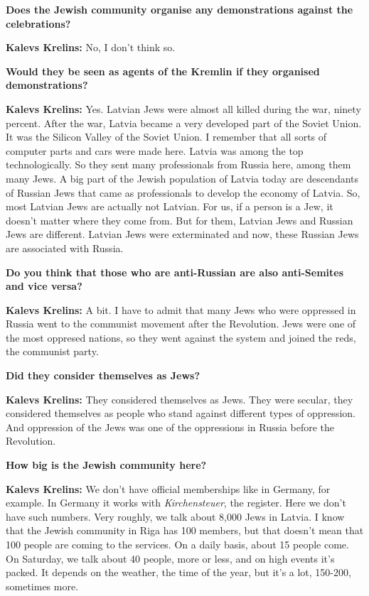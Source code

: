 \textbf{Does the Jewish community organise any demonstrations against the celebrations?} 

\textbf{Kalevs Krelins:} No, I don’t think so.  

\textbf{Would they be seen as agents of the Kremlin if they organised demonstrations?} 

\textbf{Kalevs Krelins:} Yes. Latvian Jews were almost all killed during the war, ninety percent. After the war, Latvia became a very developed part of the Soviet Union. It was the Silicon Valley of the Soviet Union. I remember that all sorts of computer parts and cars were made here. Latvia was among the top technologically. So they sent many professionals from Russia here, among them many Jews. A big part of the Jewish population of Latvia today are descendants of Russian Jews that came as professionals to develop the economy of Latvia. So, most Latvian Jews are actually not Latvian. For us, if a person is a Jew, it doesn't matter where they come from. But for them, Latvian Jews and Russian Jews are different. Latvian Jews were exterminated and now, these Russian Jews are associated with Russia.  

\textbf{Do you think that those who are anti-Russian are also anti-Semites and vice versa?} 

\textbf{Kalevs Krelins:} A bit. I have to admit that many Jews who were oppressed in Russia went to the communist movement after the Revolution. Jews were one of the most oppresed nations, so they went against the system and joined the reds, the communist party. 

\textbf{Did they consider themselves as Jews?} 

\textbf{Kalevs Krelins:} They considered themselves as Jews. They were secular, they considered themselves as people who stand against different types of oppression. And oppression of the Jews was one of the oppressions in Russia before the Revolution.   

\textbf{How big is the Jewish community here?} 

\textbf{Kalevs Krelins:} We don’t have official memberships like in Germany, for example. In Germany it works with \textit{Kirchensteuer}, the register. Here we don’t have such numbers. Very roughly, we talk about 8,000 Jews in Latvia. I know that the Jewish community in Riga has 100 members, but that doesn’t mean that 100 people are coming to the services. On a daily basis, about 15 people come. On Saturday, we talk about 40 people, more or less, and on high events it’s packed. It depends on the weather, the time of the year, but it’s a lot, 150-200, sometimes more.  

